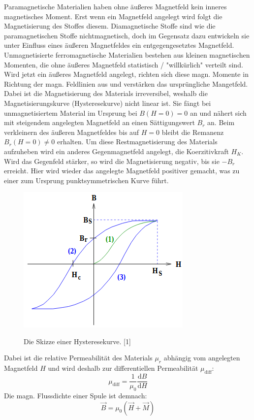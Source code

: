 \documentclass[titlepage = firstcover]{scrartcl}
\begin{document}
      Paramagnetische Materialien haben ohne äußeres Magnetfeld kein inneres magnetisches Moment. Erst wenn ein Magnetfeld angelegt wird folgt die Magnetisierung des Stoffes diesem.
      Diamagnetische Stoffe sind wie die paramagnetischen Stoffe nichtmagnetisch, doch im Gegensatz dazu entwickeln sie unter Einfluss eines äußeren Magnetfeldes ein entgegengesetztes Magnetfeld. \\
      Unmagnetisierte ferromagnetische Materialien bestehen aus kleinen magnetischen Momenten, die ohne äußeres Magnetfeld statistisch / "willkürlich" verteilt sind.
      Wird jetzt ein äußeres Magnetfeld angelegt, richten sich diese magn. Momente in Richtung der magn. Feldlinien aus und verstärken das ursprüngliche Mangetfeld.
      Dabei ist die Magnetisierung des Materials irreversibel, weshalb die Magnetisierungskurve (Hysteresekurve) nicht linear ist. Sie fängt bei
      unmagnetisiertem Material im Ursprung bei $B(H=0) = 0$ an und nähert sich mit steigendem angelegten Magnetfeld an einen Sättigungswert $B_r$ an.
      Beim verkleinern des äußeren Magnetfeldes bis auf $H = 0$ bleibt die Remanenz $B_r(H=0) \neq 0$ erhalten. Um diese Restmagnetisierung des Materials
      aufzuheben wird ein anderes Gegenmagnetfeld angelegt, die Koerzitivkraft $H_K$. Wird das Gegenfeld stärker, so wird die Magnetisierung negativ, bis
      sie $-B_r$ erreicht. Hier wird wieder das angelegte Magnetfeld positiver gemacht, was zu einer zum Ursprung punktsymmetrischen Kurve führt.
      \begin{figure}[h]
        \centering
        \caption{Die Skizze einer Hysteresekurve. [1]}
        \includegraphics[width = 0.4\linewidth]{Hysteresekurve.png}
        \label{fig:hysterese}
      \end{figure}
      Dabei ist die relative Permeabilität des Materials $\mu_r$ abhängig vom angelegten Magnetfeld $H$ und wird deshalb zur differentiellen Permeabilität $\mu_{\text{diff}}$:
      \begin{equation}
        \mu_{\text{diff}} = \frac{1}{\mu_\text{0}} \frac{\text{d}B}{\text{d}H}
      \end{equation}
      Die magn. Flussdichte einer Spule ist demnach:
      \begin{equation}
        \vec{B} = \mu_0 (\vec{H} + \vec{M})
      \end{equation}
\end{document}
